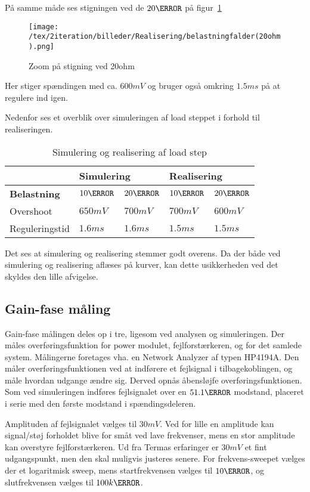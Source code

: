 På samme måde ses stigningen ved de $20\ohm$ på figur~\ref{fig:belastning_20ohm}
\begin{figure}[H]
	\center
	\texttt{[image: /tex/2iteration/billeder/Realisering/belastningfalder(20ohm).png]}
	\caption{Zoom på stigning ved 20ohm}
	\label{fig:belastning_20ohm}
\end{figure}
Her stiger spændingen med ca. $600mV$ og bruger også omkring $1.5ms$ på at regulere ind igen. 

Nedenfor ses et overblik over simuleringen af load steppet i forhold til realiseringen. 

\begin{table}[H] 			
	\centering
	\begin{tabularx}{\textwidth}{|X|l|l|l|l|}
		\hline
		& \multicolumn{2}{|l|}{\textbf{Simulering}} & \multicolumn{2}{|l|}{\textbf{Realisering}} \\ \hline
		\textbf{Belastning} & $10\ohm$ & $20\ohm$ & $10\ohm$ & $20\ohm$ \\ \hline
		Overshoot & $650mV$ & $700mV$ & $700mV$ & $600mV$  \\ \hline
		Reguleringstid & $1.6ms$ & $1.6ms$ & $1.5ms$ & $1.5ms$ \\ \hline
	\end{tabularx}
	\caption{Simulering og realisering af load step}
	\label{tab:Loadstep}
\end{table}
Det ses at simulering og realisering stemmer godt overens. Da der både ved simulering og realisering aflæses på kurver, kan dette usikkerheden ved det skyldes den lille afvigelse.

\subsection{Gain-fase måling} \label{gain_fase_2}
Gain-fase målingen deles op i tre, ligesom ved analysen og simuleringen. Der måles overføringsfunktion for power modulet, fejlforstærkeren, og for det samlede system. Målingerne foretages vha. en Network Analyzer af typen HP4194A. Den måler overføringsfunktionen ved at indførere et fejlsignal i tilbagekoblingen, og måle hvordan udgange ændre sig. Derved opnås åbensløjfe overføringsfunktionen. Som ved simuleringen indføres fejlsignalet over en $51.1\ohm$ modstand, placeret i serie med den første modstand i spændingsdeleren. 

Amplituden af fejlsignalet vælges til $30mV$. Ved for lille en amplitude kan signal/støj forholdet blive for småt ved lave frekvenser, mens en stor amplitude kan overstyre fejlforstærkeren. Ud fra Termas erfaringer er $30mV$ et fint udgangspunkt, men den skal muligvis justeres senere. For frekvens-sweepet vælges der et logaritmisk sweep, mens startfrekvensen vælges til $10\hertz$, og slutfrekvensen vælges til $100k\hertz$. 

